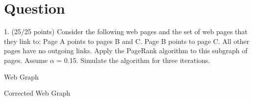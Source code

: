 \documentclass[12pt]{article}
\begin{document}
\maketitle

\section{Question}
1.	(25/25 points) Consider the following web pages and the set of web pages that they link to:
Page A points to pages B and C.
Page B points to page C.
All other pages have no outgoing links.
Apply the PageRank algorithm to this subgraph of pages. Assume $\alpha$ = 0.15. Simulate the algorithm for three iterations. 


\begin{center}Web Graph \end{center}

\begin{center}
\end{center}


\begin{center}Corrected Web Graph \end{center}
\end{document}
